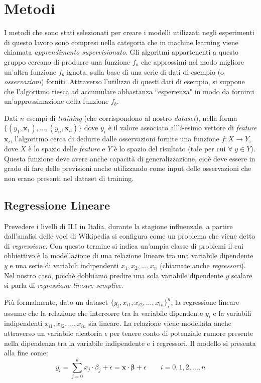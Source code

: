 \newcommand{\norm}[1]{\left\lVert#1\right\rVert} %

\chapter{Metodi}
\bigskip
I metodi che sono stati selezionati per creare i modelli utilizzati negli esperimenti di questo lavoro sono compresi nella 
categoria che in machine learning viene chiamata \textit{apprendimento supervisionato}. Gli algoritmi appartenenti a questo 
gruppo cercano di produrre una funzione $f_a$ che approssimi nel modo migliore un'altra funzione $f_b$ ignota, sulla base di
una serie di dati di esempio (o \textit{osservazioni}) forniti. Attraverso l'utilizzo di questi dati di esempio, si suppone
che l'algoritmo riesca ad accumulare abbastanza ``esperienza" in modo da fornirci un'approssimazione della funzione $f_b$. 
\bigskip

Dati $n$ esempi di \textit{training} (che corrispondono al nostro \textit{dataset}), nella forma $\{(y_1, \bm{x}_1), \ldots, (y_n, \bm{x}_n)\}$ dove $y_i$ è il valore associato all'$i$-esimo vettore di \textit{feature} $\bm{x}_i$, l'algoritmo cerca di 
dedurre dalle osservazioni fornite una funzione $f: X \rightarrow Y$, dove $X$ è lo spazio delle \textit{feature} e $Y$ è lo 
spazio del risultato (tale per cui $\forall \; y \in Y$). Questa funzione deve avere anche capacità di generalizzazione, cioè 
deve essere in grado di fare delle previsioni anche utilizzando come input delle osservazioni che non erano presenti nel 
dataset di training.

\section{Regressione Lineare}
\bigskip

Prevedere i livelli di ILI in Italia, durante la stagione influenzale, a partire dall'analisi delle voci di Wikipedia si 
configura come un problema che viene detto di \textit{regressione}. Con questo termine si indica 
un'ampia classe di problemi il cui obbiettivo è la modellazione di una relazione lineare tra una variabile dipendente $y$ e 
una serie di variabili indipendenti ${x_1, x_2, \ldots, x_n}$ (chiamate anche \textit{regressori}). Nel nostro caso, poichè 
dobbiamo predire una sola variabile dipendente $y$ scalare si parla di \textit{regressione lineare semplice}. 
\bigskip

Più formalmente, dato un dataset $\{ y_i, x_{i1}, x_{i2},\ldots, x_{in}\}^n_i$, la regressione lineare assume che la 
relazione che intercorre tra la variabile dipendente $y_i$ e la variabili indipendenti ${x_{i1}, x_{i2},\ldots, x_{in}}$ sia 
lineare. La relazione viene modellata anche attraverso un variabile aleatoria $\epsilon$ per tenere conto di potenziale 
rumore presente nella dipendenza tra la variabile indipendente e i regressori. Il modello si presenta alla fine come:
\begin{equation}
y_i = \sum_{j=0}^k x_j \cdot \beta_j + \epsilon = \bm{x\cdot\beta}+\epsilon \qquad i=0,1,2,\ldots ,n
\end{equation}

